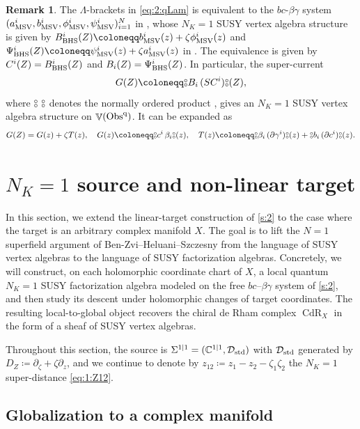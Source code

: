 \documentclass[final,reqno]{amsart}
\numberwithin{equation}{section}
\theoremstyle{definition}
\newtheorem{rmk}[thm]{Remark}
\newcommand{\ceq}{\coloneqq} %
\newcommand{\std}{\textup{std}}
\newcommand{\BHS}{\textup{BHS}}
\newcommand{\MSV}{\textup{MSV}}
\newcommand{\sC}{\mathbb{C}^{1|1}}
\newcommand{\clD}{\mathcal{D}}
\newcommand{\pd}{\partial}
\newcommand{\sSig}{\Sigma^{1|1}}
\newcommand{\qObs}[1]{\mathop{\Obs^{\textup{q}}_{#1}}}
\newcommand{\dbc}{%
 \mathrel{\vcenter{\hbox{\ooalign{%
  \raisebox{0.5ex}{$\scriptstyle \circ$}\cr%
  \raisebox{-0.5ex}{$\scriptstyle \circ$}%
 }}}}%
}
\newcommand{\nod}[1]{\mathopen{\dbc} \mathrel{#1} \mathclose{\dbc}}
\DeclareMathOperator{\CdR}{CdR}
\DeclareMathOperator{\bbV}{\mathbb{V}}
\DeclareMathOperator{\Obs}{Obs}
\begin{document}
\begin{rmk}
The $\Lambda$-brackets in \eqref{eq:2:qLam} is equivalent to 
the $bc$-$\beta\gamma$ system 
$(a^i_{\MSV},b^i_{\MSV},\phi^i_{\MSV},\psi^i_{\MSV})_{i=1}^N$ in \cite{MSV}, 
whose $N_K=1$ SUSY vertex algebra structure is given by 
$B^i_{\BHS}(Z) \ceq b^i_{\MSV}(z)+\zeta \phi^i_{\MSV}(z)$ and 
$\Psi^i_{\BHS}(Z) \ceq \psi^i_{\MSV}(z)+\zeta a^i_{\MSV}(z)$ 
in \cite[Example 3.12]{BHS}.
The equivalence is given by 
$C^i(Z) = B^i_{\BHS}(Z)$ and $B_i(Z) = \Psi^i_{\BHS}(Z)$.
In particular, the super-current
\[
 G(Z) \ceq \nod{B_i\,(S C^i)}(Z),
\]
where $\nod{\ }$ denotes the normally ordered product 
\cite[Definition 3.2.11]{HK},
gives an $N_K=1$ SUSY vertex algebra structure on $\bbV(\qObs{})$.
It can be expanded as
\[ 
 G(Z) = G(z) + \zeta T(z), \quad 
 G(z) \ceq \nod{c^i\,\beta_i}(z), \quad 
 T(z) \ceq \nod{\beta_i\,(\pd \gamma^i)}(z) + \nod{b_i\,(\pd c^i)}(z).
\]
\end{rmk}


\section{\texorpdfstring{$N_K=1$}{NK=1} source and non-linear target}
\label{s:3}

In this section, we extend the linear-target construction of \cref{s:2} 
to the case where the target is an arbitrary complex manifold $X$. 
The goal is to lift the $N=1$ superfield argument of 
Ben-Zvi--Heluani--Szczesny \cite{BHS} 
from the language of SUSY vertex algebras 
to the language of SUSY factorization algebras. 
Concretely, we will construct, on each holomorphic coordinate chart of $X$,
a local quantum $N_K=1$ SUSY factorization algebra modeled on 
the free $bc$--$\beta\gamma$ system of \cref{s:2}, 
and then study its descent under holomorphic changes of target coordinates.
The resulting local-to-global object recovers 
the chiral de Rham complex $\CdR_X$ in the form of a sheaf of SUSY vertex algebras.

Throughout this section, the source is $\sSig=(\sC,\clD_{\std})$ 
with $\clD_{\std}$ generated by $D_Z \ceq \pd_{\zeta}+\zeta\pd_{z}$,
and we continue to denote by $z_{12} \ceq z_1-z_2-\zeta_1\zeta_2$
the $N_K=1$ super-distance \eqref{eq:1:Z12}.


\subsection{Globalization to a complex manifold}\label{ss:3.1}
\end{document}
